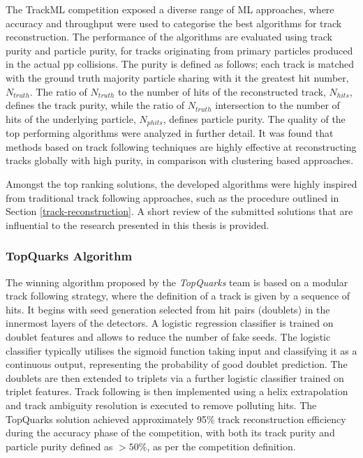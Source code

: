 The TrackML competition exposed a diverse range of ML approaches, where accuracy and throughput were used to categorise the best algorithms for track reconstruction. The performance of the algorithms are evaluated using track purity and particle purity, for tracks originating from primary particles produced in the actual pp collisions. The purity is defined as follows; each track is matched with the ground truth majority particle sharing with it the greatest hit number, $N_{truth}$. The ratio of $N_{truth}$ to the number of hits of the reconstructed track, $N_{hits}$, defines the track purity, while the ratio of $N_{truth}$ intersection to the number of hits of the underlying particle, $N_{phits}$, defines particle purity. The quality of the top performing algorithms were analyzed in further detail. It was found that methods based on track following techniques are highly effective at reconstructing tracks globally with high purity, in comparison with clustering based approaches. 

Amongst the top ranking solutions, the developed algorithms were highly inspired from traditional track following approaches, such as the procedure outlined in Section \ref{track-reconstruction}. A short review of the submitted solutions that are influential to the research presented in this thesis is provided.

\subsubsection{TopQuarks Algorithm}

The winning algorithm proposed by the \textit{TopQuarks} team is based on a modular track following strategy, where the definition of a track is given by a sequence of hits. It begins with seed generation selected from hit pairs (doublets) in the innermost layers of the detectors. A logistic regression classifier is trained on doublet features and allows to reduce the number of fake seeds. The logistic classifier typically utilises the sigmoid function taking input and classifying it as a continuous output, representing the probability of good doublet prediction. The doublets are then extended to triplets via a further logistic classifier trained on triplet features. Track following is then implemented using a helix extrapolation and track ambiguity resolution is executed to remove polluting hits. The TopQuarks solution achieved approximately 95\% track reconstruction efficiency during the accuracy phase of the competition, with both its track purity and particle purity defined as $> 50\%$, as per the competition definition.

